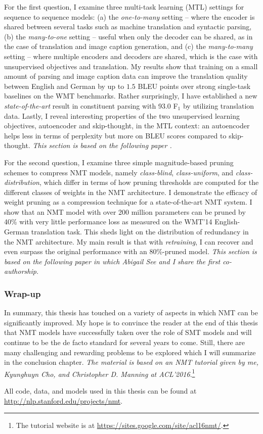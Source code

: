 For the first question, 
I examine three multi-task learning (MTL) settings for sequence to sequence
models:
(a) the {\it one-to-many} setting -- where the encoder is shared
between several tasks such as machine translation and
syntactic parsing, (b) the {\it many-to-one} setting -- useful when only the
decoder can be shared, as in the case of 
translation and image caption generation, and (c) the {\it
  many-to-many} setting -- where multiple encoders and decoders are
shared, which is the case with unsupervised objectives
and translation.  My results show that training on a small amount of parsing and
image caption data can improve the translation quality between English and
German by up to $1.5$ BLEU
points over strong single-task baselines on the WMT benchmarks. Rather
surprisingly,
I have established a new {\it
state-of-the-art} result in constituent parsing with 93.0 F$_1$ by utilizing
translation data. Lastly, I reveal interesting properties of the two unsupervised learning
objectives, autoencoder and skip-thought, in the MTL context: an autoencoder helps less in terms of
perplexity but more on BLEU scores compared to skip-thought.
{\it This section is based on the following paper \cite{luong16iclr}.}

For the second question, I examine three simple magnitude-based pruning schemes to compress NMT models, namely {\it class-blind}, {\it class-uniform}, and {\it class-distribution}, which differ in terms of how pruning thresholds are computed for the different classes of weights in the NMT architecture.
I demonstrate the efficacy of weight pruning as a compression technique for a state-of-the-art NMT system. 
I show that an NMT model with over 200 million parameters can be pruned by 40\% with very little performance loss as measured on the WMT'14 English-German translation task. 
This sheds light on the distribution of redundancy in the NMT architecture.
My main result is that with {\it retraining}, I can recover and even surpass the original performance with an 80\%-pruned model. 
{\it This section is based on the following paper \cite{see16} in which
Abigail See and I share the first co-authorship.}

\subsubsection{Wrap-up} 
In summary, this thesis has touched on a variety of aspects in which NMT can be
significantly improved. My hope is to convince the reader 
at the end of this thesis that NMT models have successfully taken over the role
of SMT models and will continue to be the de facto standard for several years
to come. Still, there are many challenging and rewarding problems to be explored
which I will summarize in the conclusion chapter. {\it The material is based on an
NMT tutorial given by me, Kyunghuyn Cho, and Christopher D. Manning at
ACL'2016}.\footnote{The tutorial website is
at \url{https://sites.google.com/site/acl16nmt/}.}

\begin{sloppypar}
All code, data, and models used in this thesis can be found at \url{http://nlp.stanford.edu/projects/nmt}.
\end{sloppypar}

